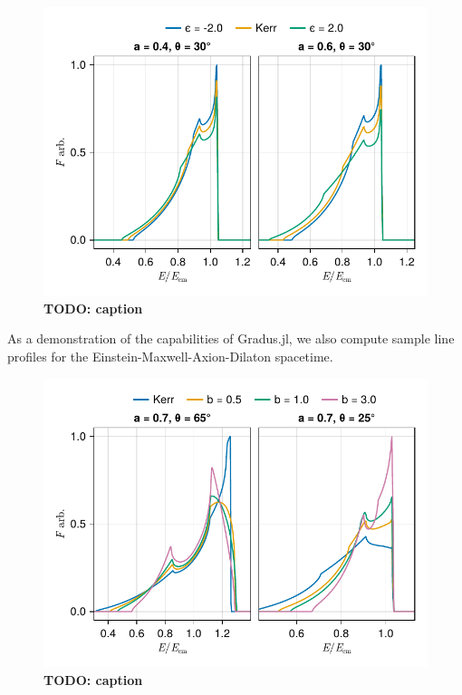 \documentclass[fleqn,usenatbib]{mnras}
\newcommand{\todo}[1]{{\noindent \bf \color{red} TODO: #1}}
\newcommand{\Gradus}{Gradus.jl\xspace}
\begin{document}
\begin{figure}
    \centering
    \includegraphics[width=0.99\linewidth]{figures/lineprofiles.johannsen-comparison.pdf}
    \caption{\todo{caption}}
    \label{fig:reflection-johannsen}
\end{figure}

As a demonstration of the capabilities of \Gradus, we also compute sample
line profiles for the Einstein-Maxwell-Axion-Dilaton spacetime.

\begin{figure}
    \centering
    \includegraphics[width=0.99\linewidth]{figures/lineprofile.emda.pdf}
    \caption{\todo{caption}}
    \label{fig:reflection-emda}
\end{figure}
\end{document}
